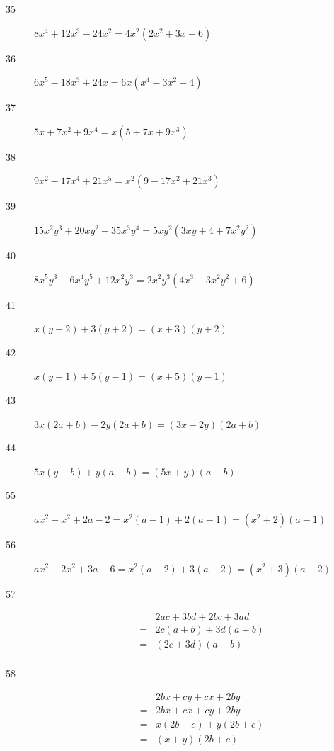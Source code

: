 \documentclass[fleqn,addpoints]{exam}
\begin{document}
\begin{description}

\item[35]
\( 8x^4 + 12x^3 - 24x^2 = 4x^2(2x^2 + 3x - 6) \)

\item[36]
\( 6x^5 - 18x^3 + 24x = 6x(x^4 - 3x^2 + 4) \)

\item[37]
\( 5x + 7x^2 + 9x^4 = x(5 + 7x + 9x^3) \)

\item[38]
\( 9x^2 - 17x^4 + 21x^5 = x^2(9 - 17x^2 + 21x^3) \)

\item[39]
\( 15x^2y^3 + 20xy^2 + 35x^3y^4 = 5xy^2(3xy + 4 + 7x^2y^2) \)

\item[40]
\( 8x^5y^3 - 6x^4y^5 + 12x^2y^3 = 2x^2y^3(4x^3 - 3x^2y^2 + 6) \)

\item[41]
\( x(y + 2) + 3(y + 2) = (x + 3)(y + 2) \)

\item[42]
\( x(y - 1) + 5(y - 1) = (x + 5)(y - 1) \)

\item[43]
\( 3x(2a + b) - 2y(2a + b) = (3x - 2y)(2a + b) \)

\item[44]
\( 5x(y - b) + y(a - b) = (5x + y)(a - b) \)

\item[55]
\( ax^2 - x^2 + 2a - 2 = x^2(a - 1) + 2(a - 1) = (x^2 + 2)(a - 1) \)

\item[56]
\( ax^2 - 2x^2 + 3a - 6 = x^2(a - 2) + 3(a - 2) = (x^2 + 3)(a - 2) \)

\item[57]
\begin{eqnarray*}
   && 2ac + 3bd + 2bc + 3ad \\
  &=& 2c(a + b) + 3d(a + b) \\
  &=& (2c + 3d)(a + b) \\
\end{eqnarray*}

\item[58]
\begin{eqnarray*}
  && 2bx + cy + cx + 2by \\
  &=& 2bx + cx + cy + 2by \\
  &=& x(2b + c) + y(2b + c) \\
  &=& (x + y)(2b + c) \\
\end{eqnarray*}


\end{description}
\end{document}
